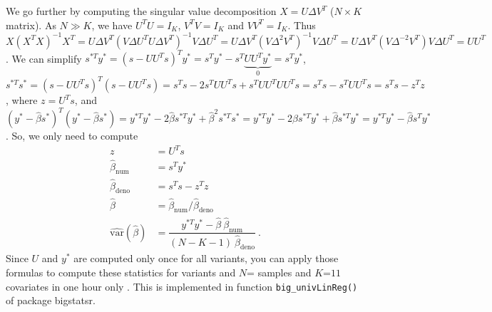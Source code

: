 We go further by computing the singular value decomposition $X = U \Delta V^T$ ($N \times K$ matrix). As $N \gg K$, we have $U^T U = I_K$, $V^T V  = I_K$ and $V V^T = I_K$. Thus $X (X^T X)^{-1} X^T = U \Delta V^T (V \Delta U^T U \Delta V^T)^{-1} V \Delta U^T = U \Delta V^T (V \Delta^2 V^T)^{-1} V \Delta U^T = U \Delta V^T (V \Delta^{-2} V^T) V \Delta U^T = U U^T$.
We can simplify $s^{*T} y^* = (s - U U^T s)^T y^* = s^T y^* - s^T \underbrace{U U^T y^*}_0 = s^T y^*$, 
$s^{*T} s^* = (s - U U^T s)^T (s - U U^T s) = s^T s - 2 s^T U U^T s + s^T U U^T U U^T s = s^T s - s^T U U^T s = s^T s - z^T z$, where $z = U^T s$, 
and $(y^* - \hat{\beta} s^*)^T (y^* - \hat{\beta} s^*) = y^{*T} y^* - 2 \hat{\beta} s^{*T} y^* + \hat{\beta}^2 s^{*T} s^* = y^{*T} y^* - 2 \hat{\beta} s^{*T} y^* + \hat{\beta} s^{*T} y^* = y^{*T} y^* - \hat{\beta} s^{T} y^*$.
So, we only need to compute
\begin{align*}
z &= U^T s \\
\hat{\beta}_{\text{num}} &= s^{T} y^* \\
\hat{\beta}_{\text{deno}} &= s^T s - z^T z \\
\hat{\beta} &= \hat{\beta}_{\text{num}} / \hat{\beta}_{\text{deno}} \\
\widehat{\text{var}}(\hat{\beta}) &= \dfrac{y^{*T} y^* - \hat{\beta} ~ \hat{\beta}_{\text{num}}}{(N - K - 1) ~ \hat{\beta}_{\text{deno}}}~.
\end{align*}
Since $U$ and $y^*$ are computed only once for all variants, you can apply those formulas to compute these statistics for  variants and $N$= samples and $K$=$11$ covariates in one hour only \cite[]{prive2018efficient}. This is implemented in function \texttt{big\_univLinReg()} of package bigstatsr.
